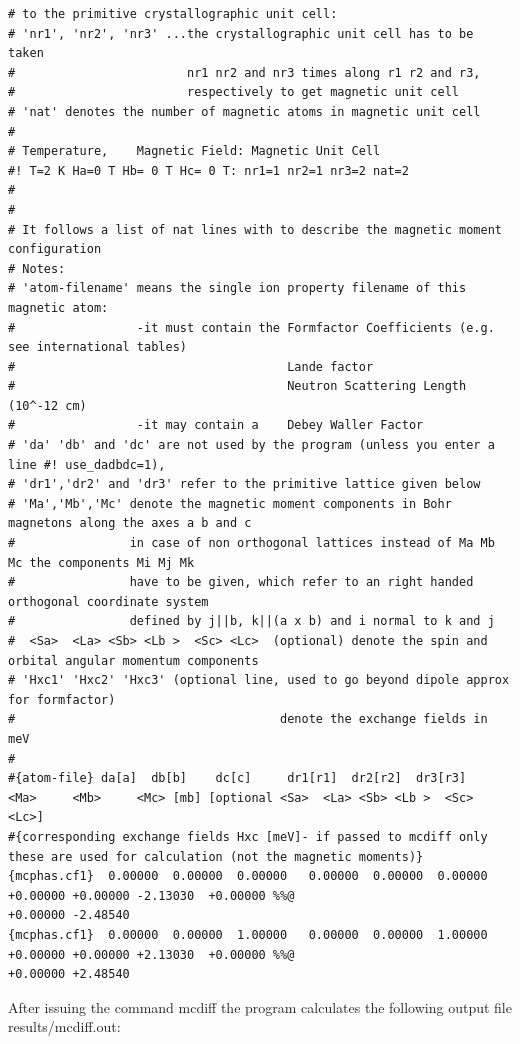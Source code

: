 {\begin{verbatim}
# to the primitive crystallographic unit cell:
# 'nr1', 'nr2', 'nr3' ...the crystallographic unit cell has to be taken 
#                        nr1 nr2 and nr3 times along r1 r2 and r3,
#                        respectively to get magnetic unit cell
# 'nat' denotes the number of magnetic atoms in magnetic unit cell
#
# Temperature,    Magnetic Field: Magnetic Unit Cell
#! T=2 K Ha=0 T Hb= 0 T Hc= 0 T: nr1=1 nr2=1 nr3=2 nat=2 
#
#
# It follows a list of nat lines with to describe the magnetic moment configuration
# Notes:
# 'atom-filename' means the single ion property filename of this magnetic atom:
#                 -it must contain the Formfactor Coefficients (e.g. see international tables)
#                                      Lande factor
#                                      Neutron Scattering Length (10^-12 cm) 
#                 -it may contain a    Debey Waller Factor
# 'da' 'db' and 'dc' are not used by the program (unless you enter a line #! use_dadbdc=1), 
# 'dr1','dr2' and 'dr3' refer to the primitive lattice given below
# 'Ma','Mb','Mc' denote the magnetic moment components in Bohr magnetons along the axes a b and c
#                in case of non orthogonal lattices instead of Ma Mb Mc the components Mi Mj Mk
#                have to be given, which refer to an right handed orthogonal coordinate system 
#                defined by j||b, k||(a x b) and i normal to k and j
#  <Sa>  <La> <Sb> <Lb >  <Sc> <Lc>  (optional) denote the spin and orbital angular momentum components 
# 'Hxc1' 'Hxc2' 'Hxc3' (optional line, used to go beyond dipole approx for formfactor)
#                                     denote the exchange fields in meV 
#
#{atom-file} da[a]  db[b]    dc[c]     dr1[r1]  dr2[r2]  dr3[r3]   <Ma>     <Mb>     <Mc> [mb] [optional <Sa>  <La> <Sb> <Lb >  <Sc> <Lc>] 
#{corresponding exchange fields Hxc [meV]- if passed to mcdiff only these are used for calculation (not the magnetic moments)}
{mcphas.cf1}  0.00000  0.00000  0.00000   0.00000  0.00000  0.00000   +0.00000 +0.00000 -2.13030  +0.00000 %%@
+0.00000 -2.48540
{mcphas.cf1}  0.00000  0.00000  1.00000   0.00000  0.00000  1.00000   +0.00000 +0.00000 +2.13030  +0.00000 %%@
+0.00000 +2.48540

\end{verbatim}
}

After issuing the command {\prg mcdiff} 
the program calculates the following output file {\prg results/mcdiff.out}:

